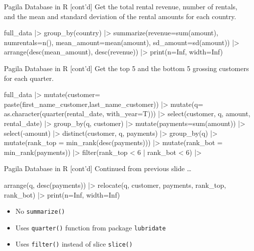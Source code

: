 \documentclass[ignorenonframetext,xcolor=x11names]{beamer}
\begin{document}
\begin{frame}[fragile]{Pagila Database in R \small [cont'd]}
Get the total rental revenue, number of rentals, and the mean and standard deviation of the rental amounts for each country.

\footnotesize
\begin{Rcode}
full_data |>
  group_by(country) |>
  summarize(revenue=sum(amount), 
            numrentals=n(),
            mean_amount=mean(amount),
            sd_amount=sd(amount)) |>
  arrange(desc(mean_amount),
          desc(revenue)) |>
  print(n=Inf, width=Inf)  
\end{Rcode}
\normalsize
\end{frame}

\begin{frame}[fragile]{Pagila Database in R \small [cont'd]}
Get the top 5 and the bottom 5 grossing customers for each quarter.

\footnotesize
\begin{Rcode}
full_data |>
  mutate(customer=
   paste(first_name_customer,last_name_customer)) |>
  mutate(q=
   as.character(quarter(rental_date, with_year=T))) |>
  select(customer, q, amount, rental_date) |>
  group_by(q, customer) |>
  mutate(payments=sum(amount)) |>
  select(-amount) |>
  distinct(customer, q, payments) |>
  group_by(q) |>
  mutate(rank_top = min_rank(desc(payments))) |>
  mutate(rank_bot = min_rank(payments)) |>
  filter(rank_top < 6 | rank_bot < 6) |>
\end{Rcode}
\end{frame}

\begin{frame}[fragile]{Pagila Database in R \small [cont'd]}
Continued from previous slide \ldots

\footnotesize
\begin{Rcode}
  arrange(q, desc(payments)) |>
  relocate(q, customer, payments, 
              rank_top, rank_bot) |>
  print(n=Inf, width=Inf)
\end{Rcode}
\normalsize
\begin{itemize}
  \item No \texttt{summarize()}
  \item Uses \texttt{quarter()} function from package \texttt{lubridate}
  \item Uses \texttt{filter()} instead of slice \texttt{slice()}
\end{itemize}
\end{frame}
\end{document}
